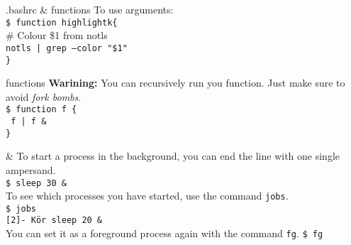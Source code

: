 \documentclass{beamer}
\let\tt\texttt
\let\bf\textbf
\let\it\itshape
\begin{document}
\begin{frame}{.bashrc \& functions}
        To use arguments:                       \\
        \tt{\$ function highlightk\{ }        \\
        \quad \# Colour \$1 from notls          \\
        \quad \tt{notls | grep --color "\$1" }  \\
        \tt{\} }                                \\
\end{frame}

\begin{frame}{functions}
        \bf{Warining:} You can recursively run you function. Just make sure to avoid {\it fork bombs}.  \\
        \tt{\$ function f \{ }        \\
        \quad \tt{ f | f {\&}}  \\
        \tt{\} }                                \\
\end{frame}

\begin{frame}{\&}
        To start a process in the background, you can end the line with one single ampersand.   \\
        \tt{\$ sleep 30 {\&} }    \\
        To see which processes you have started, use the command \tt{jobs}. \\
        \tt{\$ jobs }  \\
        \tt{[2]- Kör sleep 20 {\&}}  \\
        You can set it as a foreground process again with the command \tt{fg}.
        \tt{\$ fg}  \\
        \tt{} \\
\end{frame}
\end{document}
